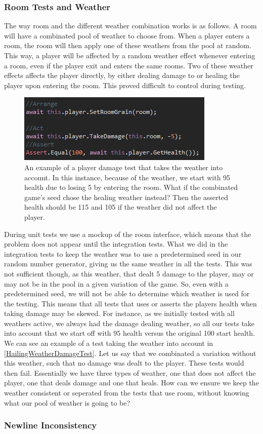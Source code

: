 \subsubsection{Room Tests and Weather}
The way room and the different weather combination works is as follows. A room will have a combinated pool of weather to choose from. When a player enters a room, the room will then apply one of these weathers from the pool at random. This way, a player will be affected by a random weather effect whenever entering a room, even if the player exit and enters the same rooms. Two of these weather effects affects the player directly, by either dealing damage to or healing the player upon entering the room. This proved difficult to control during testing. \\
\begin{figure}[h]
    \centering
    \includegraphics[width=0.5\linewidth]{Materials/TestingDiscussion/HailingWeatherDamageTest}
    \caption{An example of a player damage test that takes the weather into account. In this instance, because of the weather, we start with 95 health due to losing 5 by entering the room. What if the combinated game's seed chose the healing weather instead? Then the asserted health should be 115 and 105 if the weather did not affect the player.}
    \label{HailingWeatherDamageTest}
\end{figure}
During unit tests we use a mockup of the room interface, which means that the problem does not appear until the integration tests. What we did in the integration tests to keep the weather was to use a predetermined seed in our random number generator, giving us the same weather in all the tests. This was not sufficient though, as this weather, that dealt 5 damage to the player, may or may not be in the pool in a given variation of the game. So, even with a predetermined seed, we will not be able to determine which weather is used for the testing. This means that all tests that uses or asserts the players health when taking damage may be skewed. For instance, as we initially tested with all weathers active, we always had the damage dealing weather, so all our tests take into account that we start off with 95 health versus the original 100 start health. We can see an example of a test taking the weather into account in \autoref{HailingWeatherDamageTest}. Let us say that we combinated a variation without this weather, such that no damage was dealt to the player. These tests would then fail. Essentially we have three types of weather, one that does not affect the player, one that deals damage and one that heals. How can we ensure we keep the weather consistent or seperated from the tests that use room, without knowing what our pool of weather is going to be? 
\subsubsection{Newline Inconsistency}